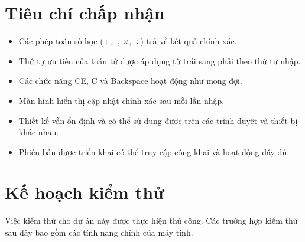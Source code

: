 \documentclass{article}
\begin{document}
\section{Tiêu chí chấp nhận}
\begin{itemize}
    \item Các phép toán số học (+, -, ×, ÷) trả về kết quả chính xác.
    \item Thứ tự ưu tiên của toán tử được áp dụng từ trái sang phải theo thứ tự nhập.
    \item Các chức năng CE, C và Backspace hoạt động như mong đợi.
    \item Màn hình hiển thị cập nhật chính xác sau mỗi lần nhập.
    \item Thiết kế vẫn ổn định và có thể sử dụng được trên các trình duyệt và thiết bị khác nhau.
    \item Phiên bản được triển khai có thể truy cập công khai và hoạt động đầy đủ.
\end{itemize}

\section{Kế hoạch kiểm thử}
Việc kiểm thử cho dự án này được thực hiện thủ công. Các trường hợp kiểm thử sau đây bao gồm các tính năng chính của máy tính.
\end{document}
